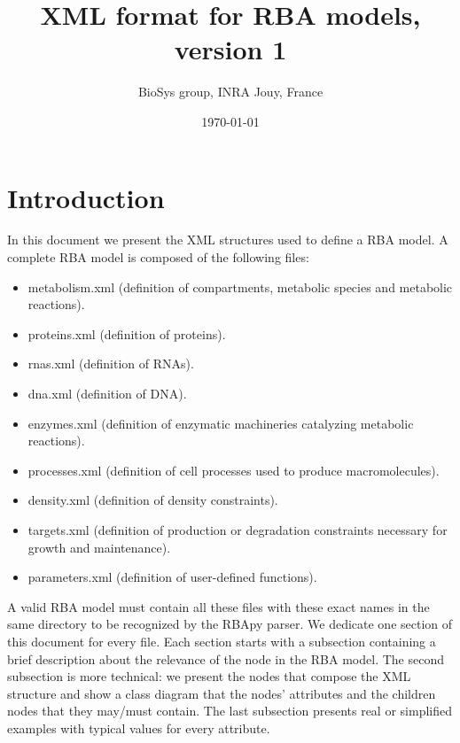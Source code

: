 \documentclass[12pt]{scrartcl}
\begin{document}
\title{XML format for RBA models, version 1}
\author{BioSys group, INRA Jouy, France}
\date{\today}

\maketitle

\newpage

\tableofcontents

\newpage

\section{Introduction}

In this document we present the XML structures used to define a RBA model.
A complete RBA model is composed of the following files:
\begin{itemize}
  \item metabolism.xml
  (definition of compartments, metabolic species and metabolic reactions).
  \item proteins.xml (definition of proteins).
  \item rnas.xml (definition of RNAs).
  \item dna.xml (definition of DNA).
  \item enzymes.xml
  (definition of enzymatic machineries catalyzing metabolic reactions).
  \item processes.xml
  (definition of cell processes used to produce macromolecules).
  \item density.xml (definition of density constraints).
  \item targets.xml
  (definition of production or degradation constraints necessary for growth and maintenance).
  \item parameters.xml
  (definition of user-defined functions).
\end{itemize}

A valid RBA model must contain all these files with these exact names in
the same directory to be recognized by the RBApy parser.
We dedicate one section of this document for every file.
Each section starts with a subsection containing a brief description
about the relevance of the node in the RBA model.
The second subsection is more technical:
we present the nodes that compose the XML structure
and show a class diagram that the nodes' attributes
and the children nodes that they may/must contain.
The last subsection presents real or simplified examples with typical values
for every attribute.
\end{document}
